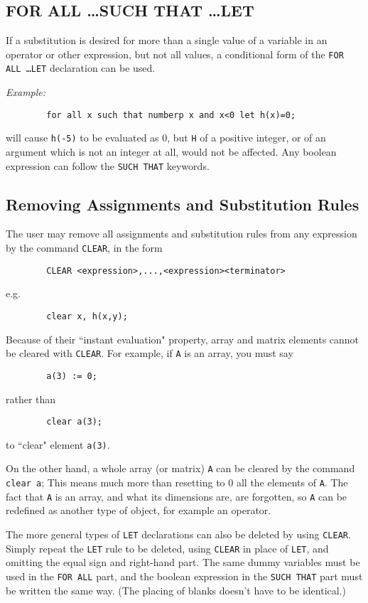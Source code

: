\subsection{FOR ALL \ldots SUCH THAT \ldots LET}
 

If a substitution is desired for more than a single value of a variable in
an operator or other expression, but not all values, a conditional form of
the {\tt FOR ALL \ldots LET} declaration can be used.

{\it Example:}
\begin{verbatim}
        for all x such that numberp x and x<0 let h(x)=0;
\end{verbatim}
will cause {\tt h(-5)} to be evaluated as 0, but {\tt H} of a positive
integer, or of an argument which is not an integer at all, would not be
affected.  Any boolean expression can follow the {\tt SUCH THAT} keywords.

\subsection{Removing Assignments and Substitution Rules} 

The user may remove all assignments and substitution rules from any
expression by the command {\tt CLEAR}, in the form
\begin{verbatim}
        CLEAR <expression>,...,<expression><terminator>
\end{verbatim}
e.g.
\begin{verbatim}
        clear x, h(x,y);
\end{verbatim}
Because of their ``instant evaluation" property, array and matrix elements
cannot be cleared with {\tt CLEAR}.  For example, if {\tt A} is an array,
you must say
\begin{verbatim}
        a(3) := 0;
\end{verbatim}
rather than
\begin{verbatim}
        clear a(3);
\end{verbatim}
to ``clear" element {\tt a(3)}.

On the other hand, a whole array (or matrix) {\tt A} can be cleared by the
command {\tt clear a};  This means much more than resetting to 0 all the
elements of {\tt A}.  The fact that {\tt A} is an array, and what its
dimensions are, are forgotten, so {\tt A} can be redefined as another type
of object, for example an operator.

The more general types of {\tt LET} declarations can also be deleted by
using {\tt CLEAR}.  Simply repeat the {\tt LET} rule to be deleted, using
{\tt CLEAR} in place of {\tt LET}, and omitting the equal sign and
right-hand part.  The same dummy variables must be used in the {\tt FOR
ALL} part, and the boolean expression in the {\tt SUCH THAT} part must be
written the same way. (The placing of blanks doesn't have to be
identical.)

